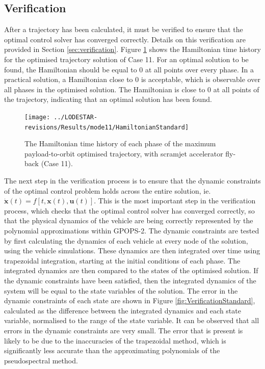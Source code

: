 \subsection{Verification}
\noindent
After a trajectory has been calculated, it must be verified to ensure that the optimal control solver has converged correctly. Details on this verification are provided in Section \ref{sec:verification}. Figure \ref{fig:HamiltonianStandard} shows the Hamiltonian time history for the optimised trajectory solution of Case 11. For an optimal solution to be found, the Hamiltonian should be equal to 0 at all points over every phase. In a practical solution, a Hamiltonian close to 0 is acceptable, which is observable over all phases in the optimised solution. The Hamiltonian is close to 0 at all points of the trajectory, indicating that an optimal solution has been found. 
\begin{figure}[ht]
	\centering
	\texttt{[image: ../LODESTAR-revisions/Results/mode11/HamiltonianStandard]}
	\caption{The Hamiltonian time history of each phase of the maximum payload-to-orbit optimised trajectory, with scramjet accelerator fly-back (Case 11).}
	\label{fig:HamiltonianStandard}
\end{figure}

The next step in the verification process is to ensure that the dynamic constraints of the optimal control problem holds across the entire solution, ie. $\dot{\textbf{x}}(t) = f[t,\textbf{x}(t),\textbf{u}(t)]$. This is the most important step in the verification process, which checks that the optimal control solver has converged correctly, so that the physical dynamics of the vehicle are being correctly represented by the polynomial approximations within GPOPS-2. The dynamic constraints are tested by first calculating the dynamics of each vehicle at every node of the solution, using the vehicle simulations. These dynamics are then integrated over time using trapezoidal integration, starting at the initial conditions of each phase. The integrated dynamics are then compared to the states of the optimised solution. If the dynamic constraints have been satisfied, then the integrated dynamics of the system will be equal to the state variables of the solution. The error in the dynamic constraints of each state are shown in Figure \ref{fig:VerificationStandard}, calculated as the difference between the integrated dynamics and each state variable, normalised to the range of the state variable. 
It can be observed that all errors in the dynamic constraints are very small. The error that is present is likely to be due to the inaccuracies of the trapezoidal method, which is significantly less accurate than the approximating polynomials of the pseudospectral method. 



